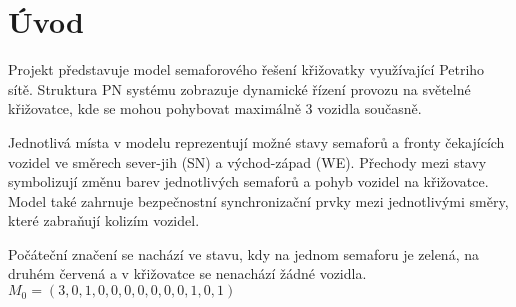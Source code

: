 \section*{Úvod}
\label{sec:introduction}

Projekt představuje model semaforového řešení křižovatky využívající Petriho sítě.
Struktura PN systému zobrazuje dynamické řízení provozu na světelné křižovatce, kde se mohou pohybovat maximálně 3 vozidla současně.

Jednotlivá místa v modelu reprezentují možné stavy semaforů a fronty čekajících vozidel ve směrech sever-jih (SN) a východ-západ (WE).
Přechody mezi stavy symbolizují změnu barev jednotlivých semaforů a pohyb vozidel na křižovatce.
Model také zahrnuje bezpečnostní synchronizační prvky mezi jednotlivými směry, které zabraňují kolizím vozidel.

Počáteční značení se nachází ve stavu, kdy na jednom semaforu je zelená, na druhém červená a v křižovatce se nenachází žádné vozidla.
$M_0 = (3, 0, 1, 0, 0, 0, 0, 0, 0, 0, 1, 0, 1)$

\endinput